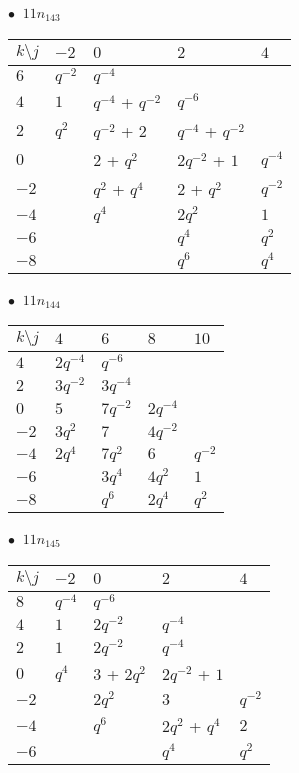 %
\begin{minipage}{\linewidth}
$\bullet\ $ $11n_{143}$ \vspace{0.5em} \\
\begin{tabular}{l|llll}
$k \setminus j$ & $-2$ & $0$ & $2$ & $4$ \\
\hline
$6$ & $q^{-2}$ & $q^{-4}$ &  &  \\
$4$ & $1$ & $q^{-4}$ + $q^{-2}$ & $q^{-6}$ &  \\
$2$ & $q^{2}$ & $q^{-2}$ + $2$ & $q^{-4}$ + $q^{-2}$ &  \\
$0$ &  & $2$ + $q^{2}$ & $2q^{-2}$ + $1$ & $q^{-4}$ \\
$-2$ &  & $q^{2}$ + $q^{4}$ & $2$ + $q^{2}$ & $q^{-2}$ \\
$-4$ &  & $q^{4}$ & $2q^{2}$ & $1$ \\
$-6$ &  &  & $q^{4}$ & $q^{2}$ \\
$-8$ &  &  & $q^{6}$ & $q^{4}$ \\
\end{tabular}
\vspace{2em}
\end{minipage}
%
\begin{minipage}{\linewidth}
$\bullet\ $ $11n_{144}$ \vspace{0.5em} \\
\begin{tabular}{l|llll}
$k \setminus j$ & $4$ & $6$ & $8$ & $10$ \\
\hline
$4$ & $2q^{-4}$ & $q^{-6}$ &  &  \\
$2$ & $3q^{-2}$ & $3q^{-4}$ &  &  \\
$0$ & $5$ & $7q^{-2}$ & $2q^{-4}$ &  \\
$-2$ & $3q^{2}$ & $7$ & $4q^{-2}$ &  \\
$-4$ & $2q^{4}$ & $7q^{2}$ & $6$ & $q^{-2}$ \\
$-6$ &  & $3q^{4}$ & $4q^{2}$ & $1$ \\
$-8$ &  & $q^{6}$ & $2q^{4}$ & $q^{2}$ \\
\end{tabular}
\vspace{2em}
\end{minipage}
%
\begin{minipage}{\linewidth}
$\bullet\ $ $11n_{145}$ \vspace{0.5em} \\
\begin{tabular}{l|llll}
$k \setminus j$ & $-2$ & $0$ & $2$ & $4$ \\
\hline
$8$ & $q^{-4}$ & $q^{-6}$ &  &  \\
$4$ & $1$ & $2q^{-2}$ & $q^{-4}$ &  \\
$2$ & $1$ & $2q^{-2}$ & $q^{-4}$ &  \\
$0$ & $q^{4}$ & $3$ + $2q^{2}$ & $2q^{-2}$ + $1$ &  \\
$-2$ &  & $2q^{2}$ & $3$ & $q^{-2}$ \\
$-4$ &  & $q^{6}$ & $2q^{2}$ + $q^{4}$ & $2$ \\
$-6$ &  &  & $q^{4}$ & $q^{2}$ \\
\end{tabular}
\vspace{2em}
\end{minipage}
